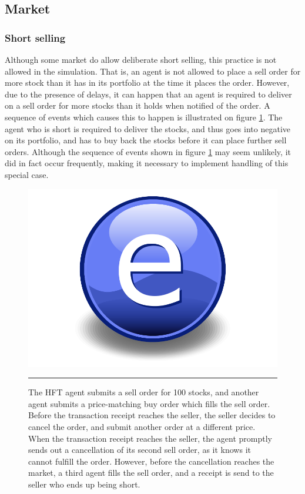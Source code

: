  
\subsection{Market}
\subsubsection{Short selling}
Although some market do allow deliberate short selling, this practice is not allowed in the simulation. That is, an agent is not allowed to place a sell order for more stock than it has in its portfolio at the time it places the order. However, due to the presence of delays, it can happen that an agent is required to deliver on a sell order for more stocks than it holds when notified of the order. A sequence of events which causes this to happen is  illustrated on figure \ref{fig:short_selling}. The agent who is short is required to deliver the stocks, and thus goes into negative on its portfolio, and has to buy back the stocks before it can place further sell orders. Although the sequence of events shown in figure \ref{fig:short_selling} may seem unlikely, it did in fact occur frequently, making it necessary to implement handling of this special case. 
\begin{figure}[htbp]
	\centering
		\includegraphics{Figures/Electron.pdf}
		\rule{35em}{0.5pt}
	\caption{The HFT agent submits a sell order for 100 stocks, and another agent submits a price-matching buy order which fills the sell order. Before the transaction receipt reaches the seller, the seller decides to cancel the order, and submit another order at a different price. When the transaction receipt reaches the seller, the agent promptly sends out a cancellation of its second sell order, as it knows it cannot fulfill the order. However, before the cancellation reaches the market, a third agent fills the sell order, and a receipt is send to the seller who ends up being short.}
	\label{fig:short_selling}
\end{figure}




